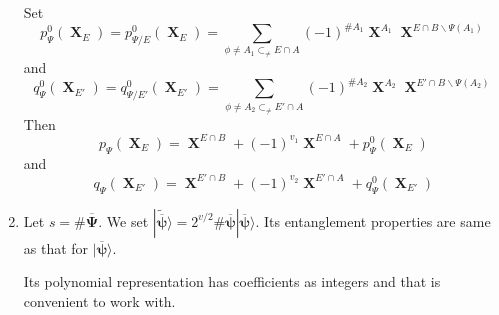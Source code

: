 \documentclass[a4paper,12pt]{article}
\DeclareMathOperator{\x}{\mathrm{X}}
\theoremstyle{definition}
\theoremstyle{underlinethm}
\theoremstyle{definition}
\begin{document}
\begin{enumerate}[label=(\alph*)]
Set 
\begin{equation}
p^{0}_{\Psi}(\boldsymbol{\x}_{E}) = p^{0}_{\Psi/E}(\boldsymbol{\x}_{E}) = \sum_{\phi \neq A_{1} \subset_{\neq} E \cap A}(-1)^{\# A_{1}} {\boldsymbol{\x}^{A_{1}}} {\boldsymbol{\x}^{E \cap B \smallsetminus \Psi(A_{1})}}\tag{3.22}\label{eq-3.22}
\end{equation}
and 
\begin{equation}
q_{\Psi}^{0} (\boldsymbol{\x}_{E'}) = q^{0}_{\Psi/E'}(\boldsymbol{\x}_{E'})= \sum_{\phi \neq A_{2} \subset_{\neq} E' \cap A}(-1)^{\# A_{2}} {\boldsymbol{\x}^{A_{2}}} {\boldsymbol{\x}^{E' \cap B \smallsetminus \Psi(A_{2})}}\tag{3.23}\label{eq-3.23}
\end{equation}
Then
\begin{equation}
p_{\Psi}(\boldsymbol{\x}_{E}) = \boldsymbol{\x}^{E \cap B} + (-1)^{v_{1}} \boldsymbol{\x}^{E \cap A} + p^{0}_{\Psi}(\boldsymbol{\x}_{E})\tag{3.24}
\end{equation}
and
\begin{equation}
q_{\Psi}(\boldsymbol{\x}_{E'}) = \boldsymbol{\x}^{E' \cap B} + (-1)^{v_{2}} \boldsymbol{\x}^{E' \cap A} + q^{0}_{\Psi}(\boldsymbol{\x}_{E'})\tag{3.25}
\end{equation}

\item Let $s= \# {\overline{\boldsymbol{\Psi}}}$. We set $| \widetilde{\overline{\boldsymbol{\psi}}} \rangle = 2^{v/2} \# \overline{\boldsymbol{\psi}} |\overline{\boldsymbol{\psi}} \rangle$. Its entanglement properties are same as that for $| \overline{\boldsymbol{\psi}} \rangle$.

Its polynomial representation has coefficients as integers and that is convenient to work with.


\end{enumerate}
\end{document}
